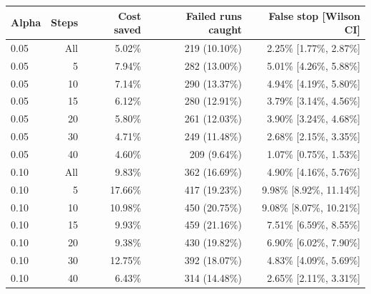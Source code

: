 \begin{tabular}{lrrrr}
\toprule
Alpha & Steps & Cost saved & Failed runs caught & False stop [Wilson CI] \\
\midrule
0.05 & All & 5.02\% & 219 (10.10\%) & 2.25\% [1.77\%, 2.87\%] \\
0.05 & 5 & 7.94\% & 282 (13.00\%) & 5.01\% [4.26\%, 5.88\%] \\
0.05 & 10 & 7.14\% & 290 (13.37\%) & 4.94\% [4.19\%, 5.80\%] \\
0.05 & 15 & 6.12\% & 280 (12.91\%) & 3.79\% [3.14\%, 4.56\%] \\
0.05 & 20 & 5.80\% & 261 (12.03\%) & 3.90\% [3.24\%, 4.68\%] \\
0.05 & 30 & 4.71\% & 249 (11.48\%) & 2.68\% [2.15\%, 3.35\%] \\
0.05 & 40 & 4.60\% & 209 (9.64\%) & 1.07\% [0.75\%, 1.53\%] \\
0.10 & All & 9.83\% & 362 (16.69\%) & 4.90\% [4.16\%, 5.76\%] \\
0.10 & 5 & 17.66\% & 417 (19.23\%) & 9.98\% [8.92\%, 11.14\%] \\
0.10 & 10 & 10.98\% & 450 (20.75\%) & 9.08\% [8.07\%, 10.21\%] \\
0.10 & 15 & 9.93\% & 459 (21.16\%) & 7.51\% [6.59\%, 8.55\%] \\
0.10 & 20 & 9.38\% & 430 (19.82\%) & 6.90\% [6.02\%, 7.90\%] \\
0.10 & 30 & 12.75\% & 392 (18.07\%) & 4.83\% [4.09\%, 5.69\%] \\
0.10 & 40 & 6.43\% & 314 (14.48\%) & 2.65\% [2.11\%, 3.31\%] \\
\bottomrule
\end{tabular}
